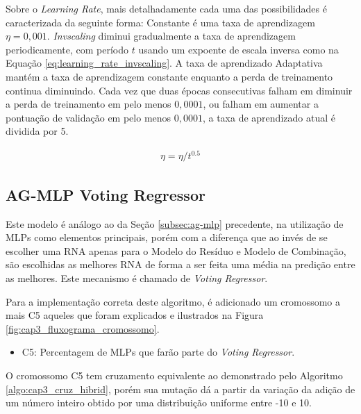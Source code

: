 Sobre o \textit{Learning Rate}, mais detalhadamente cada uma das possibilidades é caracterizada da seguinte forma: Constante é uma taxa de aprendizagem $\eta=0,001$. \textit{Invscaling} diminui gradualmente a taxa de aprendizagem periodicamente, com período $t$ usando um expoente de escala inversa como na Equação \ref{eq:learning_rate_invscaling}. A taxa de aprendizado Adaptativa mantém a taxa de aprendizagem constante enquanto a perda de treinamento continua diminuindo. Cada vez que duas épocas consecutivas falham em diminuir a perda de treinamento em pelo menos $0,0001$, ou falham em aumentar a pontuação de validação em pelo menos $0,0001$, a taxa de aprendizado atual é dividida por 5.

\begin{equation}
\label{eq:learning_rate_invscaling}
    \begin{gathered}
    \eta = \eta \slash t^{0.5}
    \end{gathered}
\end{equation}

\subsection{AG-MLP Voting Regressor}
\label{subsec:ag-mlp-vr}

Este modelo é análogo ao da Seção \ref{subsec:ag-mlp} precedente, na utilização de MLPs como elementos principais, porém com a diferença que ao invés de se escolher uma RNA apenas para o Modelo do Resíduo e Modelo de Combinação, são escolhidas as melhores RNA de forma a ser feita uma média na predição entre as melhores. Este mecanismo é chamado de \textit{Voting Regressor}. 

Para a implementação correta deste algoritmo, é adicionado um cromossomo a mais C5 aqueles que foram explicados e ilustrados na Figura \ref{fig:cap3_fluxograma_cromossomo}. 

\begin{itemize}
    \item C5: Percentagem de MLPs que farão parte do \textit{Voting Regressor}.
\end{itemize}

O cromossomo C5 tem cruzamento equivalente ao demonstrado pelo Algoritmo \ref{algo:cap3_cruz_hibrid}, porém sua mutação dá a partir da variação da adição de um número inteiro obtido por uma distribuição uniforme entre -10 e 10. 